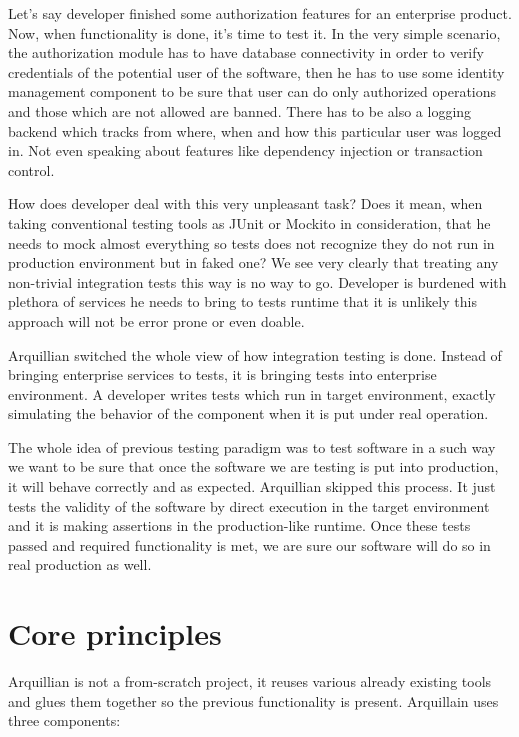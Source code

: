 \documentclass[12pt,final,oneside]{fithesis}
\begin{document}
Let's say developer finished some authorization features for an enterprise product. Now, when functionality is done, it's time to test it. In the very simple scenario, the authorization module has to have database connectivity in order to verify credentials of the potential user of the software, then he has to use some identity management component to be sure that user can do only authorized operations and those which are not allowed are banned. There has to be also a logging backend which tracks from where, when and how this particular user was logged in. Not even speaking about features like dependency injection or transaction control.

How does developer deal with this very unpleasant task? Does it mean, when taking conventional testing tools as JUnit or Mockito in consideration, that he needs to mock almost everything so tests does not recognize they do not run in production environment but in faked one? We see very clearly that treating any non-trivial integration tests this way is no way to go. Developer is burdened with plethora of services he needs to bring to tests runtime that it is unlikely this approach will not be error prone or even doable.
	
Arquillian switched the whole view of how integration testing is done. Instead of bringing enterprise services to tests, it is bringing tests into enterprise environment. A developer writes tests which run in target environment, exactly simulating the behavior of the component when it is put under real operation.

The whole idea of previous testing paradigm was to test software in a such way we want to be sure that once the software we are testing is put into production, it will behave correctly and as expected. Arquillian skipped this process. It just tests the validity of the software by direct execution in the target environment and it is making assertions in the production-like runtime. Once these tests passed and required functionality is met, we are sure our software will do so in real production as well.

	\section{Core principles}
	
Arquillian is not a from-scratch project, it reuses various already existing tools and glues them together so the previous functionality is present. Arquillain uses three components:
\end{document}

